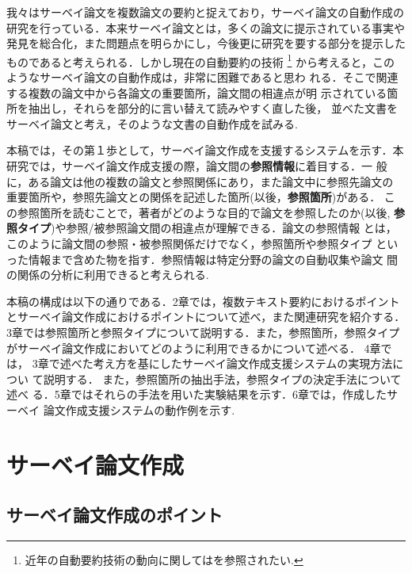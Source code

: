 我々はサーベイ論文を複数論文の要約と捉えており，サーベイ論文の自動作成の
研究を行っている．本来サーベイ論文とは，多くの論文に提示されている事実や
発見を総合化，また問題点を明らかにし，今後更に研究を要する部分を提示した
ものであると考えられる\cite{Garvey79}．しかし現在の自動要約の技術
\footnote{近年の自動要約技術の動向に関しては\cite{奥村98}を参照されたい.}
から考えると，このようなサーベイ論文の自動作成は，非常に困難であると思わ
れる．そこで関連する複数の論文中から各論文の重要箇所，論文間の相違点が明
示されている箇所を抽出し，それらを部分的に言い替えて読みやすく直した後，
並べた文書をサーベイ論文と考え，そのような文書の自動作成を試みる.

本稿では，その第１歩として，サーベイ論文作成を支援するシステムを示す．本
研究では，サーベイ論文作成支援の際，論文間の{\bf 参照情報}に着目する．一
般に，ある論文は他の複数の論文と参照関係にあり，また論文中に参照先論文の
重要箇所や，参照先論文との関係を記述した箇所(以後，{\bf 参照箇所})がある．
この参照箇所を読むことで，著者がどのような目的で論文を参照したのか(以後,
{\bf 参照タイプ})や参照/被参照論文間の相違点が理解できる．論文の参照情報
とは，このように論文間の参照・被参照関係だけでなく，参照箇所や参照タイプ
といった情報まで含めた物を指す．参照情報は特定分野の論文の自動収集や論文
間の関係の分析に利用できると考えられる.

本稿の構成は以下の通りである．2章では，複数テキスト要約におけるポイント
とサーベイ論文作成におけるポイントについて述べ，また関連研究を紹介する．
3章では参照箇所と参照タイプについて説明する．また，参照箇所，参照タイプ
がサーベイ論文作成においてどのように利用できるかについて述べる． 4章では，
3章で述べた考え方を基にしたサーベイ論文作成支援システムの実現方法につい
て説明する． また，参照箇所の抽出手法，参照タイプの決定手法について述べ
る．5章ではそれらの手法を用いた実験結果を示す．6章では，作成したサーベイ
論文作成支援システムの動作例を示す.

\section{サーベイ論文作成}

\subsection{サーベイ論文作成のポイント}

